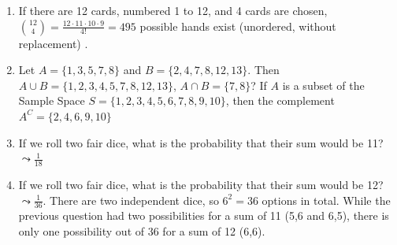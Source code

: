 \documentclass[
  letterpaper,
]{book}
\theoremstyle{definition}
\theoremstyle{definition}
\theoremstyle{plain}
\theoremstyle{definition}
\theoremstyle{plain}
\theoremstyle{plain}
\theoremstyle{remark}
\begin{document}
\begin{enumerate}
\def\labelenumi{\arabic{enumi}.}
\item
  If there are 12 cards, numbered 1 to 12, and 4 cards are chosen,
  \(\binom{12}{4} = \frac{12\cdot 11\cdot 10\cdot 9}{4!} = 495\)
  possible hands exist (unordered, without replacement) .
\item
  Let \(A = \{1,3,5,7,8\}\) and \(B = \{2,4,7,8,12,13\}\). Then
  \(A \cup B = \{1, 2, 3, 4, 5, 7, 8, 12, 13\}\),
  \(A \cap B = \{7, 8\}\)? If \(A\) is a subset of the Sample Space
  \(S = \{1,2,3,4,5,6,7,8,9,10\}\), then the complement
  \(A^C = \{2, 4, 6, 9, 10\}\)
\item
  If we roll two fair dice, what is the probability that their sum would
  be 11? \(\leadsto \frac{1}{18}\)
\item
  If we roll two fair dice, what is the probability that their sum would
  be 12? \(\leadsto \frac{1}{36}\). There are two independent dice, so
  \(6^2 = 36\) options in total. While the previous question had two
  possibilities for a sum of 11 (5,6 and 6,5), there is only one
  possibility out of 36 for a sum of 12 (6,6).
\end{enumerate}


\backmatter
\end{document}
